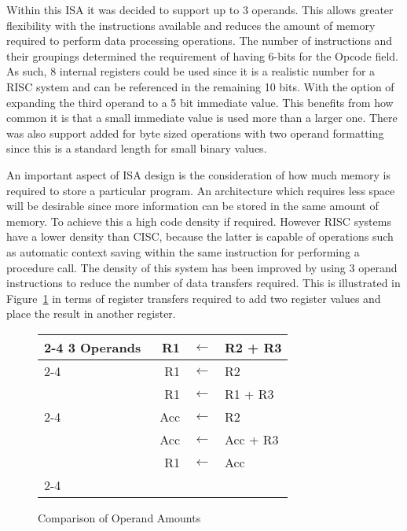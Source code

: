 Within this ISA it was decided to support up to 3 operands. This allows greater flexibility with the instructions available and reduces the amount of memory required to perform data processing operations. The number of instructions and their groupings determined the requirement of having 6-bits for the Opcode field. As such, 8 internal registers could be used since it is a realistic number for a RISC system and can be referenced in the remaining 10 bits. With the option of expanding the third operand to a 5 bit immediate value. This benefits from how common it is that a small immediate value is used more than a larger one. There was also support added for byte sized operations with two operand formatting since this is a standard length for small binary values. 

An important aspect of ISA design is the consideration of how much memory is required to store a particular program. An architecture which requires less space will be desirable since more information can be stored in the same amount of memory. To achieve this a high code density if required. However RISC systems have a lower density than CISC, because the latter is capable of operations such as automatic context saving within the same instruction for performing a procedure call. The density of this system has been improved by using 3 operand instructions to reduce the number of data transfers required. This is illustrated in Figure~\ref{fig:NoOperands} in terms of register transfers required to add two register values and place the result in another register. 

\begin{figure}[h]
\setlength{\tabcolsep}{2pt}
\centering
\footnotesize
\begin{tabular}{l|rcl|}
	\cline{2-4}
	3 Operands & R1 & $\leftarrow$ & R2 + R3 \\
	\cline{2-4}
	\multirow{2}{*}{2 Operands} & R1 & $\leftarrow$ & R2 \\
	 & R1 & $\leftarrow$ & R1 + R3 \\
	\cline{2-4}
	\multirow{3}{*}{1 Operand} & Acc & $\leftarrow$ & R2 \\
	 & ~Acc & $\leftarrow$ & Acc + R3 \hspace{0.5cm} \\
	 & R1 & $\leftarrow$ & Acc \\
	\cline{2-4}
\end{tabular}
\caption{Comparison of Operand Amounts}
\label{fig:NoOperands}
\end{figure}

